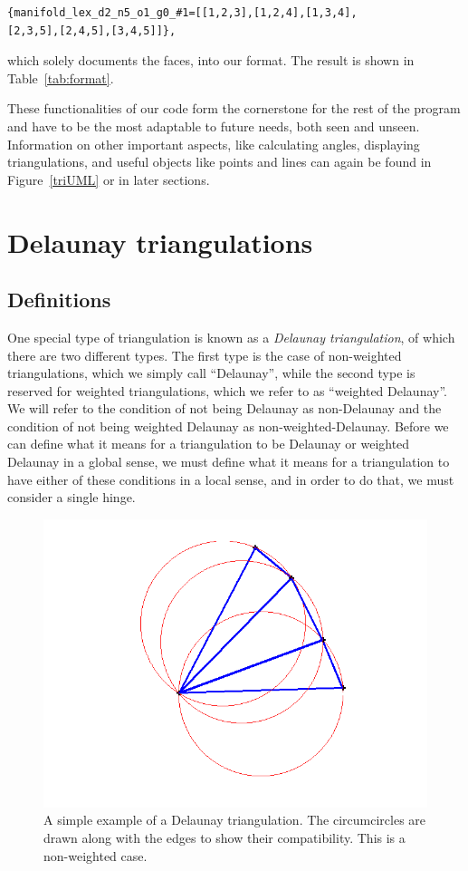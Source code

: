 \documentclass[12pt]{article}
\begin{document}
\begin{verbatim}{manifold_lex_d2_n5_o1_g0_#1=[[1,2,3],[1,2,4],[1,3,4],
[2,3,5],[2,4,5],[3,4,5]]},
\end{verbatim}
 
 which solely documents the faces, into our format. The result is shown in Table~\ref{tab:format}.

 These functionalities of our code form the cornerstone for the rest of the program and have to be the most adaptable to future needs, both seen and unseen. Information on other important aspects, like calculating angles, displaying triangulations, and useful objects like points and lines can again be found in Figure~\ref{triUML} or in later sections. 

\section{Delaunay triangulations}
\label{DT}

\subsection{Definitions}
\label{DTD}

 One special type of triangulation is known as a \textit{Delaunay triangulation}, of which there are two different types. The first type is the case of non-weighted triangulations, which we simply call ``Delaunay'', while the second type is reserved for weighted triangulations, which we refer to as ``weighted Delaunay''. We will refer to the condition of not being Delaunay as non-Delaunay and the condition of not being weighted Delaunay as non-weighted-Delaunay. Before we can define what it means for a triangulation to be Delaunay or weighted Delaunay in a global sense, we must define what it means for a triangulation to have either of these conditions in a local sense, and in order to do that, we must consider a single hinge.

\begin{figure}
\centering
\includegraphics[scale = 0.6]{Pictures/genTri4.png}
\caption{A simple example of a Delaunay triangulation. The circumcircles are drawn along with the edges to show their compatibility. This is a non-weighted case.}
\label{genTri}
\end{figure}
\end{document}
